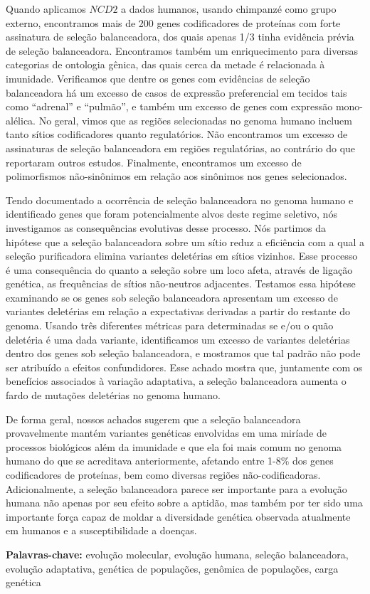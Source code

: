 \begin{small}
Quando aplicamos $NCD2$ a dados humanos, usando chimpanzé como grupo externo, encontramos mais de 200 genes codificadores de proteínas com forte assinatura de seleção balanceadora, dos quais apenas 1/3 tinha evidência prévia de seleção balanceadora. Encontramos também um enriquecimento para diversas categorias de ontologia gênica, das quais cerca da metade é relacionada à imunidade. Verificamos que dentre os genes com evidências de seleção balanceadora há um excesso de casos de expressão preferencial em tecidos tais como \enquote{adrenal} e \enquote{pulmão}, e também um excesso de genes com expressão mono-alélica. No geral, vimos que as regiões selecionadas no genoma humano incluem tanto sítios codificadores quanto regulatórios. Não encontramos um excesso de assinaturas de seleção balanceadora em regiões regulatórias, ao contrário do que reportaram outros estudos. Finalmente, encontramos um excesso de polimorfismos não-sinônimos em relação aos sinônimos nos genes selecionados.

Tendo documentado a ocorrência de seleção balanceadora no genoma humano e identificado genes que foram potencialmente alvos deste regime seletivo, nós investigamos as consequências evolutivas desse processo. Nós partimos da hipótese que a seleção balanceadora sobre um sítio reduz a eficiência com a qual a seleção purificadora elimina variantes deletérias em sítios vizinhos. Esse processo é uma consequência do quanto a seleção sobre um loco afeta, através de ligação genética, as frequências de sítios não-neutros adjacentes. Testamos essa hipótese examinando se os genes sob seleção balanceadora apresentam um excesso de variantes deletérias em relação a expectativas derivadas a partir do restante do genoma. Usando três diferentes métricas para determinadas se e/ou o quão deletéria é uma dada variante, identificamos um excesso de variantes deletérias dentro dos genes sob seleção balanceadora, e mostramos que tal padrão não pode ser atribuído a efeitos confundidores. Esse achado mostra que, juntamente com os benefícios associados à variação adaptativa, a seleção balanceadora aumenta o fardo de mutações deletérias no genoma humano. 

De forma geral, nossos achados sugerem que a seleção balanceadora provavelmente mantém variantes genéticas envolvidas em uma miríade de processos biológicos além da imunidade e que ela foi mais comum no genoma humano do que se acreditava anteriormente, afetando entre 1-8\% dos genes codificadores de proteínas, bem como diversas regiões não-codificadoras. Adicionalmente, a seleção balanceadora parece ser importante para a evolução humana não apenas por seu efeito sobre a aptidão, mas também por ter sido uma importante força capaz de moldar a diversidade genética observada atualmente em humanos e a susceptibilidade a doenças. 

\vspace{1em}
\noindent\textbf{Palavras-chave:} evolução molecular, evolução humana, seleção balanceadora, evolução adaptativa, genética de populações, genômica de populações, carga genética
\end{small}

